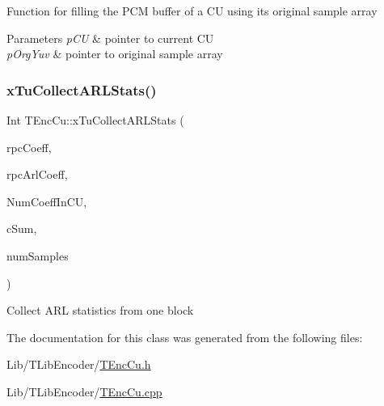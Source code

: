 Function for filling the P\+CM buffer of a CU using its original sample array 
\begin{DoxyParams}{Parameters}
{\em p\+CU} & pointer to current CU \\
\hline
{\em p\+Org\+Yuv} & pointer to original sample array \\
\hline
\end{DoxyParams}
\mbox{\label{class_t_enc_cu_aa933e8f45f81ccb032e7392314db8cfa}} 
\subsubsection{\texorpdfstring{x\+Tu\+Collect\+A\+R\+L\+Stats()}{xTuCollectARLStats()}}
{\footnotesize\ttfamily Int T\+Enc\+Cu\+::x\+Tu\+Collect\+A\+R\+L\+Stats (\begin{DoxyParamCaption}\item[{\hyperlink{_type_def_8h_a5bdd3b17d14ed1978c366d2d958c0300}{T\+Coeff} $\ast$}]{rpc\+Coeff,  }\item[{\hyperlink{_type_def_8h_a5bdd3b17d14ed1978c366d2d958c0300}{T\+Coeff} $\ast$}]{rpc\+Arl\+Coeff,  }\item[{Int}]{Num\+Coeff\+In\+CU,  }\item[{Double $\ast$}]{c\+Sum,  }\item[{U\+Int $\ast$}]{num\+Samples }\end{DoxyParamCaption})\hspace{0.3cm}{\ttfamily [protected]}}

Collect A\+RL statistics from one block 

The documentation for this class was generated from the following files\+:\begin{DoxyCompactItemize}
\item 
Lib/\+T\+Lib\+Encoder/\hyperlink{_t_enc_cu_8h}{T\+Enc\+Cu.\+h}\item 
Lib/\+T\+Lib\+Encoder/\hyperlink{_t_enc_cu_8cpp}{T\+Enc\+Cu.\+cpp}\end{DoxyCompactItemize}
